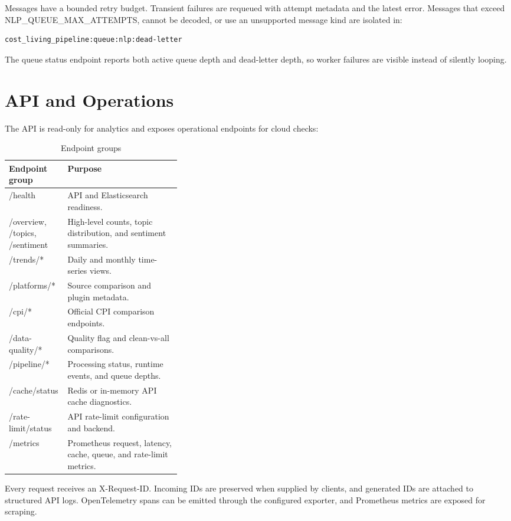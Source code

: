 \documentclass[11pt,a4paper]{article}
\renewcommand{\texttt}[1]{{\small\ttfamily\textcolor{black!85}{#1}}}
\newcommand{\idx}[1]{\texttt{#1}}
\begin{document}
Messages have a bounded retry budget. Transient failures are requeued with attempt metadata and the latest error. Messages that exceed \idx{NLP\_QUEUE\_MAX\_ATTEMPTS}, cannot be decoded, or use an unsupported message kind are isolated in:

\begin{lstlisting}
cost_living_pipeline:queue:nlp:dead-letter
\end{lstlisting}

The queue status endpoint reports both active queue depth and dead-letter depth, so worker failures are visible instead of silently looping.

\section{API and Operations}

The API is read-only for analytics and exposes operational endpoints for cloud checks:

\begin{table}[H]
\centering
\caption{Endpoint groups}
\begin{tabularx}{\linewidth}{p{0.34\linewidth}Y}
\toprule
Endpoint group & Purpose \\
\midrule
\idx{/health} & API and Elasticsearch readiness. \\
\idx{/overview}, \idx{/topics}, \idx{/sentiment} & High-level counts, topic distribution, and sentiment summaries. \\
\idx{/trends/*} & Daily and monthly time-series views. \\
\idx{/platforms/*} & Source comparison and plugin metadata. \\
\idx{/cpi/*} & Official CPI comparison endpoints. \\
\idx{/data-quality/*} & Quality flag and clean-vs-all comparisons. \\
\idx{/pipeline/*} & Processing status, runtime events, and queue depths. \\
\idx{/cache/status} & Redis or in-memory API cache diagnostics. \\
\idx{/rate-limit/status} & API rate-limit configuration and backend. \\
\idx{/metrics} & Prometheus request, latency, cache, queue, and rate-limit metrics. \\
\bottomrule
\end{tabularx}
\end{table}

Every request receives an \idx{X-Request-ID}. Incoming IDs are preserved when supplied by clients, and generated IDs are attached to structured API logs. OpenTelemetry spans can be emitted through the configured exporter, and Prometheus metrics are exposed for scraping.
\end{document}
